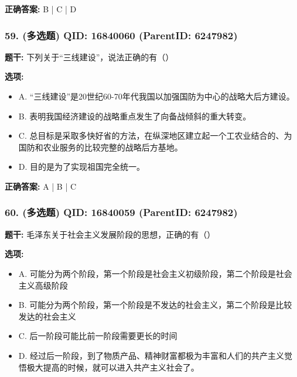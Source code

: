 \documentclass[12pt,UTF8]{ctexart}
\begin{document}
\textbf{正确答案:}
B | C | D

\vspace{0.3em}\hrulefill\vspace{0.7em}

\subsubsection*{59. (多选题) \small QID: 16840060 (ParentID: 6247982)}

\textbf{题干:}
下列关于“三线建设”，说法正确的有（）



\textbf{选项:}
\begin{itemize}[leftmargin=*]

  \item A. “三线建设”是20世纪60-70年代我国以加强国防为中心的战略大后方建设。

  \item B. 表明我国经济建设的战略重点发生了向备战倾斜的重大转变。

  \item C. 总目标是采取多快好省的方法，在纵深地区建立起一个工农业结合的、为国防和农业服务的比较完整的战略后方基地。

  \item D. 目的是为了实现祖国完全统一。

\end{itemize}

\textbf{正确答案:}
A | B | C

\vspace{0.3em}\hrulefill\vspace{0.7em}

\subsubsection*{60. (多选题) \small QID: 16840059 (ParentID: 6247982)}

\textbf{题干:}
毛泽东关于社会主义发展阶段的思想，正确的有（）



\textbf{选项:}
\begin{itemize}[leftmargin=*]

  \item A. 可能分为两个阶段，第一个阶段是社会主义初级阶段，第二个阶段是社会主义高级阶段

  \item B. 可能分为两个阶段，第一个阶段是不发达的社会主义，第二个阶段是比较发达的社会主义

  \item C. 后一阶段可能比前一阶段需要更长的时间

  \item D. 经过后一阶段，到了物质产品、精神财富都极为丰富和人们的共产主义觉悟极大提高的时候，就可以进入共产主义社会了。

\end{itemize}
\end{document}
